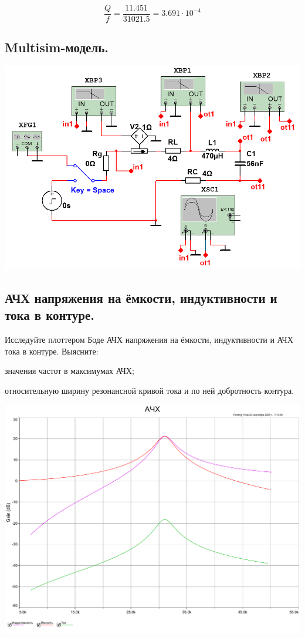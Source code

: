 \documentclass[12pt,a4paper]{article}
\begin{document}
		\[\frac{Q}{f} = \frac{11.451}{31021.5} = 3.691 \cdot 10^{-4}\]
		
		\medskip
		\medskip
		
		
		\subsection{Multisim-модель.\newline}
			\includegraphics[width=\linewidth]{src/model}
			\label{fig:model}

		\newpage
		
		\subsection{АЧХ напряжения на ёмкости, индуктивности и тока в контуре.\newline}	
		
			Исследуйте плоттером Боде АЧХ напряжения на ёмкости, индуктивности и АЧХ тока в контуре.
			Выясните: 
			
			значения частот в максимумах АЧХ;
			
			относительную ширину резонансной кривой тока и по ней добротность контура.
			
						
			\includegraphics[width=\linewidth]{src/MFH}
\end{document}

